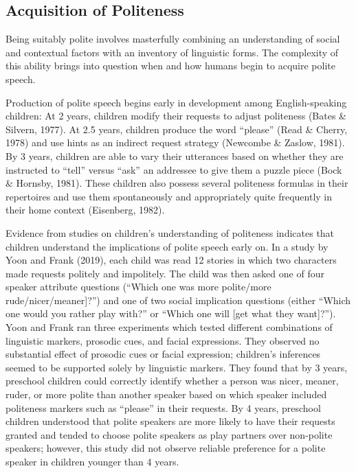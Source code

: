 \documentclass[
  english,
  man,floatsintext]{apa6}
\begin{document}
\hypertarget{acquisition-of-politeness}{%
\subsection{Acquisition of Politeness}\label{acquisition-of-politeness}}

Being suitably polite involves masterfully combining an understanding of social and contextual factors with an inventory of linguistic forms. The complexity of this ability brings into question when and how humans begin to acquire polite speech.

Production of polite speech begins early in development among English-speaking children: At 2 years, children modify their requests to adjust politeness (Bates \& Silvern, 1977). At 2.5 years, children produce the word ``please'' (Read \& Cherry, 1978) and use hints as an indirect request strategy (Newcombe \& Zaslow, 1981). By 3 years, children are able to vary their utterances based on whether they are instructed to ``tell'' versus ``ask'' an addressee to give them a puzzle piece (Bock \& Hornsby, 1981). These children also possess several politeness formulas in their repertoires and use them spontaneously and appropriately quite frequently in their home context (Eisenberg, 1982).

Evidence from studies on children's understanding of politeness indicates that children understand the implications of polite speech early on. In a study by Yoon and Frank (2019), each child was read 12 stories in which two characters made requests politely and impolitely. The child was then asked one of four speaker attribute questions (``Which one was more polite/more rude/nicer/meaner{]}?'') and one of two social implication questions (either ``Which one would you rather play with?'' or ``Which one will {[}get what they want{]}?''). Yoon and Frank ran three experiments which tested different combinations of linguistic markers, prosodic cues, and facial expressions. They observed no substantial effect of prosodic cues or facial expression; children's inferences seemed to be supported solely by linguistic markers. They found that by 3 years, preschool children could correctly identify whether a person was nicer, meaner, ruder, or more polite than another speaker based on which speaker included politeness markers such as ``please'' in their requests. By 4 years, preschool children understood that polite speakers are more likely to have their requests granted and tended to choose polite speakers as play partners over non-polite speakers; however, this study did not observe reliable preference for a polite speaker in children younger than 4 years.
\end{document}
